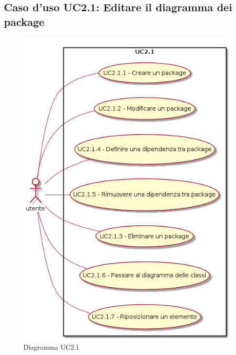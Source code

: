 \documentclass[../AnalisiDeiRequisiti.tex]{subfiles}
\begin{document}
	\subsection{Caso d'uso UC2.1: Editare il diagramma dei package}
	\begin{figure} [H]
		\centering
		\includegraphics[scale=0.45]{./Figures/UC2-1.png}
		\caption{Diagramma UC2.1}\label{}
	\end{figure}
\end{document}
